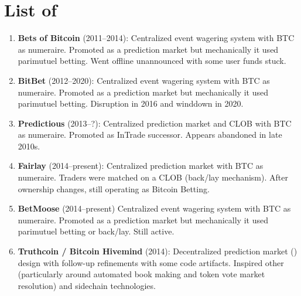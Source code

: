
\section{List of \depms}
\label{app:list}


\begin{enumerate}

\item \textbf{Bets of Bitcoin} (2011--2014): Centralized event wagering system with BTC as numeraire. Promoted as a prediction market but mechanically it used parimutuel betting. Went offline unannounced with some user funds stuck.

\item \textbf{BitBet} (2012--2020): Centralized event wagering system with BTC as numeraire. Promoted as a prediction market but mechanically it used parimutuel betting. Disruption in 2016 and winddown in 2020. 

\item \textbf{Predictious} (2013--?): Centralized prediction market and CLOB with BTC as numeraire. Promoted as InTrade successor. Appears abandoned in late 2010s.

\item \textbf{Fairlay} (2014--present): Centralized prediction market with BTC as numeraire. Traders were matched on a CLOB (back/lay mechanism). After ownership changes, still operating as Bitcoin Betting. 

\item \textbf{BetMoose} (2014--present) Centralized event wagering system with BTC as numeraire. Promoted as a prediction market but mechanically it used parimutuel betting or back/lay. Still active. 

\item \textbf{Truthcoin / Bitcoin Hivemind} (2014): Decentralized prediction market (\depm) design with follow-up refinements with some code artifacts. Inspired other \depms (particularly around automated book making and token vote market resolution) and sidechain technologies.


\end{enumerate}

